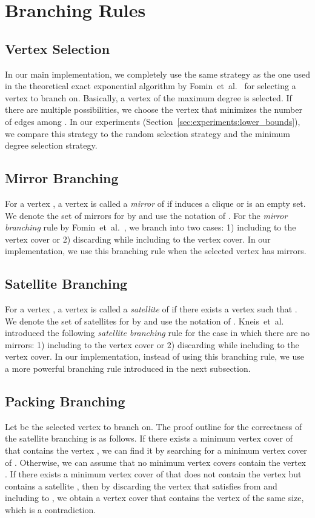 \documentclass[11pt]{article}
\begin{document}
 \section{Branching Rules}\label{sec:branching}

\subsection{Vertex Selection}
In our main implementation, we completely use the same strategy as the one used in the theoretical exact exponential
algorithm by Fomin~et~al.~\cite{vc_reduction/measure_and_conquer} for selecting a vertex to branch on.
Basically, a vertex of the maximum degree is selected.
If there are multiple possibilities, we choose the vertex  that minimizes the number of edges among .
In our experiments (Section~\ref{sec:experiments:lower_bounds}), we compare this strategy to the random selection strategy and the
minimum degree selection strategy.

\subsection{Mirror Branching}\label{sec:branching:mirror}
For a vertex , a vertex  is called a \emph{mirror} of  if  induces a clique or
is an empty set.
We denote the set of mirrors for  by  and use the notation of .
For the \emph{mirror branching} rule by Fomin~et~al.~\cite{vc_reduction/measure_and_conquer},
we branch into two cases: 1) including  to the vertex cover or 2) discarding  while including  to the
vertex cover.
In our implementation, we use this branching rule when the selected vertex  has mirrors.

\subsection{Satellite Branching}
For a vertex , a vertex  is called a \emph{satellite} of  if there exists a vertex  such
that .
We denote the set of satellites for  by  and use the notation of
.
Kneis~et~al.~\cite{DBLP:conf/fsttcs/KneisLR09} introduced the following \emph{satellite branching} rule for the case
in which there are no mirrors: 1) including  to the vertex cover or 2) discarding  while including
 to the vertex cover.
In our implementation, instead of using this branching rule, we use a more powerful branching rule introduced in the
next subsection.

\subsection{Packing Branching}\label{sec:branching:packing}
Let  be the selected vertex to branch on.
The proof outline for the correctness of the satellite branching is as follows.
If there exists a minimum vertex cover of  that contains the vertex , we can find it by searching for a minimum vertex
cover of .
Otherwise, we can assume that no minimum vertex covers contain the vertex .
If there exists a minimum vertex cover  of  that does not contain the vertex  but contains a satellite
, then by discarding the vertex  that satisfies  from  and
including  to , we obtain a vertex cover that contains the vertex  of the same size, which is a contradiction.
\end{document}
